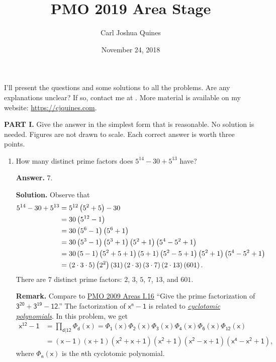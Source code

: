 \documentclass[11pt,paper=letter]{scrartcl}
\begin{document}
\title{PMO 2019 Area Stage}
\author{Carl Joshua Quines}
\date{November 24, 2018}

\maketitle

I'll present the questions and some solutions to all the problems. Are any explanations unclear? If so, contact me at . More material is available on my website: \url{https://cjquines.com}.

\textbf{PART I.} Give the answer in the simplest form that is reasonable. No solution is needed. Figures are not drawn to scale. Each correct answer is worth three points.

\begin{enumerate}[left=0pt]

\item How many distinct prime factors does $5^{14} - 30 + 5^{13}$ have?

{\sffamily \bfseries Answer.} $\boxed{7}$.

{\sffamily \bfseries Solution.} Observe that
\begin{align*}
  5^{14} - 30 + 5^{13} &= 5^{12}\left( 5^2 + 5 \right) - 30 \\
  &= 30\left( 5^{12} - 1 \right) \\
  &= 30\left( 5^6 - 1 \right)\left( 5^6 + 1 \right) \\
  &= 30\left( 5^3 - 1 \right)\left( 5^3 + 1 \right)\left( 5^2 + 1 \right)\left( 5^4 - 5^2 + 1 \right) \\
  &= 30\left( 5 - 1 \right)\left( 5^2 + 5 + 1 \right)\left( 5 + 1 \right)\left( 5^2 - 5 + 1 \right)\left( 5^2 + 1 \right)\left( 5^4 - 5^2 + 1 \right) \\
  &= \left( 2 \cdot 3 \cdot 5 \right)\left( 2^2 \right)\left( 31 \right)\left( 2 \cdot 3 \right)\left( 3 \cdot 7 \right)\left( 2 \cdot 13 \right)\left( 601 \right).
\end{align*}
There are $7$ distinct prime factors: $2$, $3$, $5$, $7$, $13$, and $601$.

{\small \sffamily \textbf{Remark.} Compare to \href{http://cjquines.com/files/pmo2009.pdf}{PMO 2009 Areas I.16} ``Give the prime factorization of $\mathsf{3^{20} + 3^{19} - 12}$.'' The factorization of $\mathsf{x^n - 1}$ is related to \href{https://en.wikipedia.org/wiki/Cyclotomic_polynomial}{\emph{cyclotomic polynomials}}. In this problem, we get \begin{align*}\mathsf{x^{12} - 1} &= \mathsf{\prod_{d|12}\Phi_d(x) = \Phi_1(x)\Phi_2(x)\Phi_3(x)\Phi_4(x)\Phi_6(x)\Phi_{12}(x)} \\ &= \mathsf{(x-1)(x+1)(x^2+x+1)(x^2+1)(x^2-x+1)(x^4-x^2+1)},\end{align*} where $\mathsf{\Phi_n(x)}$ is the $\mathsf{n}$th cyclotomic polynomial.}


\end{enumerate}
\end{document}
